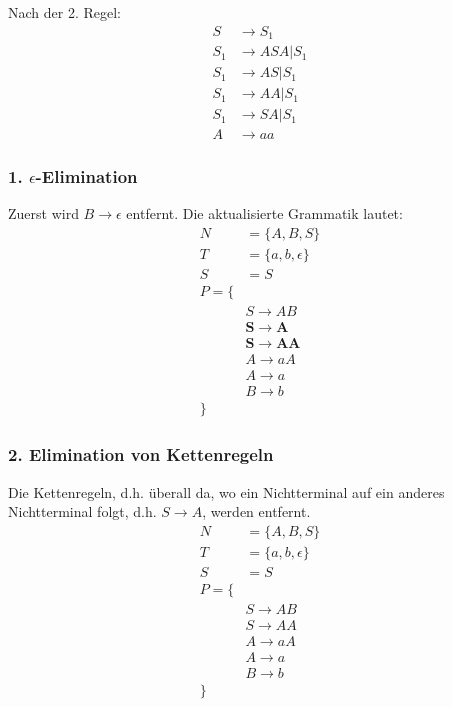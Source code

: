 Nach der 2. Regel:
\begin{align*}
    S&\to S_1\\
    S_1&\to ASA|S_1\\
    S_1&\to AS|S_1\\
    S_1&\to AA|S_1\\
    S_1&\to SA|S_1\\
    A&\to aa
\end{align*}
\subsubsection{1. $\epsilon$-Elimination}
Zuerst wird $B\to \epsilon$ entfernt. Die aktualisierte Grammatik lautet:
\begin{align*}
    N&=\{A,B,S\}\\
    T&=\{a,b,\epsilon\}\\
    S&=S\\
    P=\{\\
    &S\to AB\\
    &\mathbf{S\to A}\\
    &\mathbf{S\to AA}\\
    &A\to aA\\
    &A\to a\\
    &B\to b\\
    \}
\end{align*}
\subsubsection{2. Elimination von Kettenregeln}
Die Kettenregeln, d.h. überall da, wo ein Nichtterminal auf ein anderes Nichtterminal folgt, d.h. $S\to A$, werden entfernt.
\begin{align*}
    N&=\{A,B,S\}\\
    T&=\{a,b,\epsilon\}\\
    S&=S\\
    P=\{\\
    &S\to AB\\
    &S\to AA\\
    &A\to aA\\
    &A\to a\\
    &B\to b\\
    \}
\end{align*}
